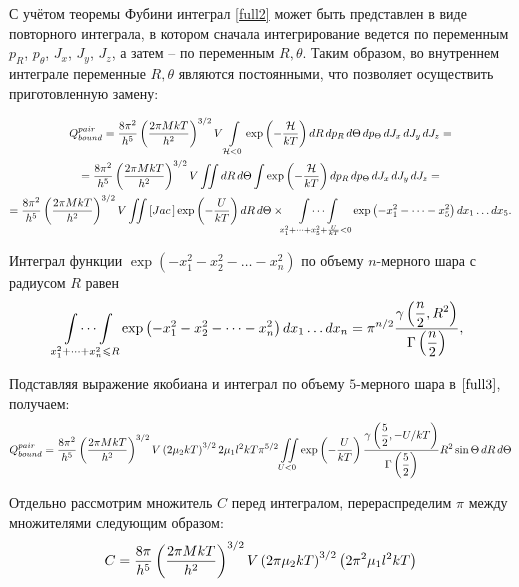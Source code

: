 \documentclass[12pt]{article}
\newcommand{\lb}{\left(}
\newcommand{\rb}{\right)}
\newcommand{\mH}{\mathcal{H}}
\newcommand{\intl}{\int\limits}
\begin{document}
С учётом теоремы Фубини интеграл \eqref{full2} может быть представлен в виде повторного интеграла, в котором сначала интегрирование ведется по переменным $p_R$, $p_\theta$, $J_x$, $J_y$, $J_z$, а затем  -- по переменным $R, \theta$. Таким образом, во внутреннем интеграле переменные $R, \theta$ являются постоянными, что позволяет осуществить приготовленную замену:

\begin{gather}
		Q_{bound}^{pair} = \frac{8 \pi^2}{h^5} \lb \frac{2 \pi M k T}{h^2} \rb^{3/2} V \intl_{\mH < 0} \exp \lb -\frac{\mH}{kT} \rb dR \, dp_R \, d \Theta \, dp_\Theta \, d J_x \, d J_y \, d J_z = \notag \\
		= \frac{8 \pi^2}{h^5} \lb \frac{2 \pi M k T}{h^2} \rb^{3/2} V \iint dR \, d \Theta \int \exp \lb -\frac{\mH}{kT} \rb d p_R \, d p_\Theta \, d J_x \, d J_y \, d J_z = \notag \\
		= \frac{8 \pi^2}{h^5} \lb \frac{2 \pi M k T}{h^2} \rb^{3/2} V \iint  \left[ Jac \, \right] \exp \lb -\frac{U}{kT} \rb d R \, d \Theta \times \idotsint\limits_{x_1^2 + \dots + x_5^2 + \frac{U}{kT} < 0} \exp \lb - x_1^2 - \dots - x_5^2 \rb dx_1 \dots dx_5. \label{full3}
\end{gather}

Интеграл функции $\exp \lb - x_1^2  - x_2^2 - \dots - x_n^2 \rb$ по объему $n$-мерного шара с радиусом $R$ равен 
\begin{gather}
	\idotsint\limits_{x_1^2 + \dots + x_n^2 \leqslant R} \exp \lb -x_1^2 - x_2^2 - \dots - x_n^2 \rb d x_1 \dots d x_n = \pi^{n/2} \frac{\gamma \lb \displaystyle \frac{n}{2}, R^2 \rb}{\Gamma \lb \displaystyle \frac{n}{2} \rb}, \notag
\end{gather}

Подставляя выражение якобиана и интеграл по объему $5$-мерного шара в $\eqref{full3}$, получаем:
\begin{gather}
		Q_{bound}^{pair} = \frac{8 \pi^2}{h^5} \lb \frac{2 \pi M k T}{h^2} \rb^{3/2} V \lb 2 \mu_2 k T \rb^{3/2} 2 \mu_1 l^2 k T \pi^{5/2} \iint\limits_{U < 0} \exp \lb - \frac{U}{k T} \rb \frac{\gamma \lb \displaystyle \frac{5}{2}, -U/kT \rb}{\Gamma \lb \displaystyle \frac{5}{2} \rb} R^2 \sin \Theta \, d R \, d \Theta \notag
\end{gather}

Отдельно рассмотрим множитель $C$ перед интегралом, перераспределим $\pi$ между множителями следующим образом:
\begin{gather}
	C = \frac{8 \pi}{h^5} \lb \frac{2 \pi M k T}{h^2} \rb^{3/2} V \lb 2 \pi \mu_2 k T \rb^{3/2} \lb 2 \pi^2 \mu_1 l^2 k T \rb \notag
\end{gather}
\end{document}
